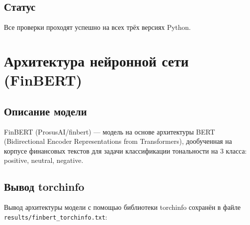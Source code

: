 \documentclass[a4paper,12pt]{article}
\begin{document}
\subsection{Статус}

Все проверки проходят успешно на всех трёх версиях Python.


\section{Архитектура нейронной сети (FinBERT)}

\subsection{Описание модели}

FinBERT (ProsusAI/finbert) --- модель на основе архитектуры BERT
(Bidirectional Encoder Representations from Transformers),
дообученная на корпусе финансовых текстов для задачи классификации тональности
на 3 класса: positive, neutral, negative.

\subsection{Вывод torchinfo}

Вывод архитектуры модели с помощью библиотеки torchinfo сохранён
в файле \texttt{results/finbert\_torchinfo.txt}:
\end{document}
